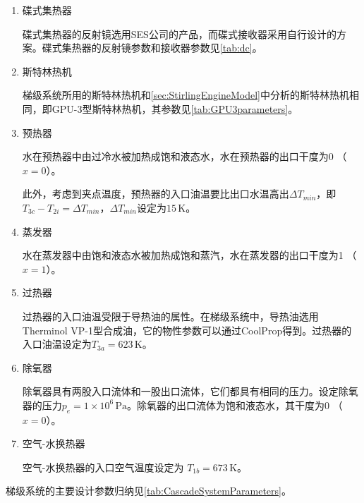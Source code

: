 \begin{enumerate}[label=(\arabic*)]
\item 碟式集热器

碟式集热器的反射镜选用SES公司的产品，而碟式接收器采用自行设计的方案。碟式集热器的反射镜参数和接收器参数见\autoref{tab:dc}。

\item 斯特林热机

梯级系统所用的斯特林热机和\autoref{sec:StirlingEngineModel}中分析的斯特林热机相同，即GPU-3型斯特林热机，其参数见\autoref{tab:GPU3parameters}。

\item 预热器

水在预热器中由过冷水被加热成饱和液态水，水在预热器的出口干度为0 （$x = 0$）。

此外，考虑到夹点温度，预热器的入口油温要比出口水温高出$\Delta T_{min}$，即$T_{3c} - T_{2i} = \Delta T_{min}$，$\Delta T_{min}$设定为$15\,\mathrm{K}$。

\item 蒸发器

水在蒸发器中由饱和液态水被加热成饱和蒸汽，水在蒸发器的出口干度为1 （$x = 1$）。

\item 过热器

过热器的入口油温受限于导热油的属性。在梯级系统中，导热油选用Therminol VP-1型合成油，它的物性参数可以通过CoolProp得到。过热器的入口油温设定为$T_{3a} = 623\,\mathrm{K}$。

\item 除氧器

除氧器具有两股入口流体和一股出口流体，它们都具有相同的压力。设定除氧器的压力$p_e = 1\times10^6\,\mathrm{Pa}$。除氧器的出口流体为饱和液态水，其干度为0 （$x = 0$）。

\item 空气-水换热器

空气-水换热器的入口空气温度设定为 $T_{1b} = 673\,\mathrm{K}$。
\end{enumerate}

\smallskip{}
梯级系统的主要设计参数归纳见\autoref{tab:CascadeSystemParameters}。

